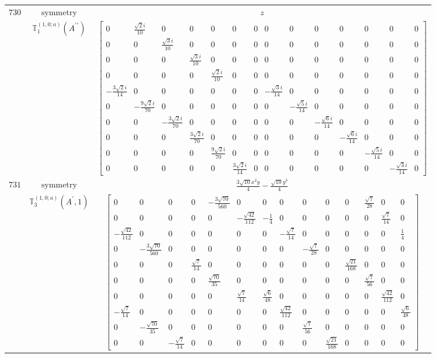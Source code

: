 \documentclass[fleqn,8pt,landscape]{jsarticle}
\begin{document}
\begin{longtable}{ccc}
$ 730 $ & $ \text{symmetry} $ & $ z $ \\
$  $ & $ \mathbb{T}_{1}^{(1,0;a)}(A^{\prime\prime}) $ & $ \begin{bmatrix} 0 & \frac{\sqrt{2} i}{10} & 0 & 0 & 0 & 0 & 0 & 0 & 0 & 0 & 0 & 0 & 0 & 0 \\ 0 & 0 & \frac{\sqrt{3} i}{10} & 0 & 0 & 0 & 0 & 0 & 0 & 0 & 0 & 0 & 0 & 0 \\ 0 & 0 & 0 & \frac{\sqrt{3} i}{10} & 0 & 0 & 0 & 0 & 0 & 0 & 0 & 0 & 0 & 0 \\ 0 & 0 & 0 & 0 & \frac{\sqrt{2} i}{10} & 0 & 0 & 0 & 0 & 0 & 0 & 0 & 0 & 0 \\ - \frac{3 \sqrt{2} i}{14} & 0 & 0 & 0 & 0 & 0 & 0 & - \frac{\sqrt{3} i}{14} & 0 & 0 & 0 & 0 & 0 & 0 \\ 0 & - \frac{9 \sqrt{2} i}{70} & 0 & 0 & 0 & 0 & 0 & 0 & - \frac{\sqrt{5} i}{14} & 0 & 0 & 0 & 0 & 0 \\ 0 & 0 & - \frac{3 \sqrt{2} i}{70} & 0 & 0 & 0 & 0 & 0 & 0 & - \frac{\sqrt{6} i}{14} & 0 & 0 & 0 & 0 \\ 0 & 0 & 0 & \frac{3 \sqrt{2} i}{70} & 0 & 0 & 0 & 0 & 0 & 0 & - \frac{\sqrt{6} i}{14} & 0 & 0 & 0 \\ 0 & 0 & 0 & 0 & \frac{9 \sqrt{2} i}{70} & 0 & 0 & 0 & 0 & 0 & 0 & - \frac{\sqrt{5} i}{14} & 0 & 0 \\ 0 & 0 & 0 & 0 & 0 & \frac{3 \sqrt{2} i}{14} & 0 & 0 & 0 & 0 & 0 & 0 & - \frac{\sqrt{3} i}{14} & 0 \end{bmatrix} $ \\ \hline
$ 731 $ & $ \text{symmetry} $ & $ \frac{3 \sqrt{10} x^{2} y}{4} - \frac{\sqrt{10} y^{3}}{4} $ \\
$  $ & $ \mathbb{T}_{3}^{(1,0;a)}(A^{\prime},1) $ & $ \begin{bmatrix} 0 & 0 & 0 & 0 & - \frac{3 \sqrt{70}}{560} & 0 & 0 & 0 & 0 & 0 & 0 & \frac{\sqrt{7}}{28} & 0 & 0 \\ 0 & 0 & 0 & 0 & 0 & - \frac{\sqrt{42}}{112} & - \frac{1}{4} & 0 & 0 & 0 & 0 & 0 & \frac{\sqrt{7}}{14} & 0 \\ - \frac{\sqrt{42}}{112} & 0 & 0 & 0 & 0 & 0 & 0 & - \frac{\sqrt{7}}{14} & 0 & 0 & 0 & 0 & 0 & \frac{1}{4} \\ 0 & - \frac{3 \sqrt{70}}{560} & 0 & 0 & 0 & 0 & 0 & 0 & - \frac{\sqrt{7}}{28} & 0 & 0 & 0 & 0 & 0 \\ 0 & 0 & 0 & \frac{\sqrt{7}}{14} & 0 & 0 & 0 & 0 & 0 & 0 & \frac{\sqrt{21}}{168} & 0 & 0 & 0 \\ 0 & 0 & 0 & 0 & \frac{\sqrt{70}}{35} & 0 & 0 & 0 & 0 & 0 & 0 & \frac{\sqrt{7}}{56} & 0 & 0 \\ 0 & 0 & 0 & 0 & 0 & \frac{\sqrt{7}}{14} & \frac{\sqrt{6}}{48} & 0 & 0 & 0 & 0 & 0 & \frac{\sqrt{42}}{112} & 0 \\ - \frac{\sqrt{7}}{14} & 0 & 0 & 0 & 0 & 0 & 0 & \frac{\sqrt{42}}{112} & 0 & 0 & 0 & 0 & 0 & \frac{\sqrt{6}}{48} \\ 0 & - \frac{\sqrt{70}}{35} & 0 & 0 & 0 & 0 & 0 & 0 & \frac{\sqrt{7}}{56} & 0 & 0 & 0 & 0 & 0 \\ 0 & 0 & - \frac{\sqrt{7}}{14} & 0 & 0 & 0 & 0 & 0 & 0 & \frac{\sqrt{21}}{168} & 0 & 0 & 0 & 0 \end{bmatrix} $ \\ \hline

\end{longtable}
\end{document}

